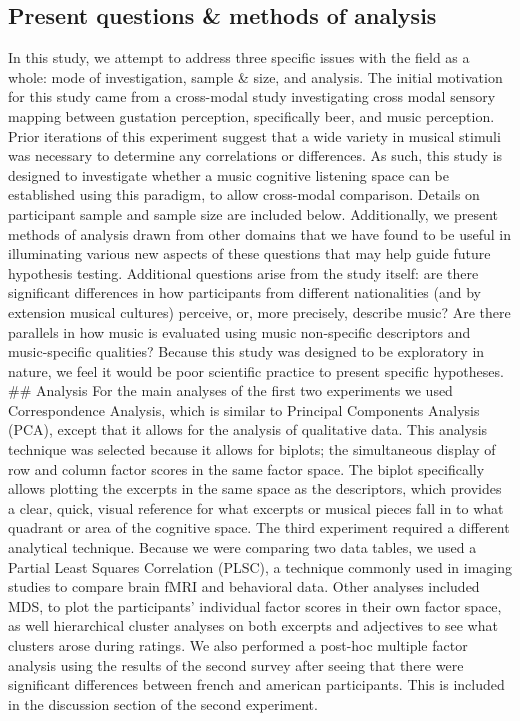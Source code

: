 \documentclass[
  english,
  man,floatsintext]{apa6}
\begin{document}
\hypertarget{present-questions-methods-of-analysis}{%
\subsection{Present questions \& methods of analysis}\label{present-questions-methods-of-analysis}}

In this study, we attempt to address three specific issues with the field as a whole: mode of investigation, sample \& size, and analysis. The initial motivation for this study came from a cross-modal study investigating cross modal sensory mapping between gustation perception, specifically beer, and music perception. Prior iterations of this experiment suggest that a wide variety in musical stimuli was necessary to determine any correlations or differences. As such, this study is designed to investigate whether a music cognitive listening space can be established using this paradigm, to allow cross-modal comparison. Details on participant sample and sample size are included below.
Additionally, we present methods of analysis drawn from other domains that we have found to be useful in illuminating various new aspects of these questions that may help guide future hypothesis testing.
Additional questions arise from the study itself: are there significant differences in how participants from different nationalities (and by extension musical cultures) perceive, or, more precisely, describe music? Are there parallels in how music is evaluated using music non-specific descriptors and music-specific qualities? Because this study was designed to be exploratory in nature, we feel it would be poor scientific practice to present specific hypotheses.\\
\#\# Analysis
For the main analyses of the first two experiments we used Correspondence Analysis, which is similar to Principal Components Analysis (PCA), except that it allows for the analysis of qualitative data. This analysis technique was selected because it allows for biplots; the simultaneous display of row and column factor scores in the same factor space. The biplot specifically allows plotting the excerpts in the same space as the descriptors, which provides a clear, quick, visual reference for what excerpts or musical pieces fall in to what quadrant or area of the cognitive space. The third experiment required a different analytical technique. Because we were comparing two data tables, we used a Partial Least Squares Correlation (PLSC), a technique commonly used in imaging studies to compare brain fMRI and behavioral data. Other analyses included MDS, to plot the participants' individual factor scores in their own factor space, as well hierarchical cluster analyses on both excerpts and adjectives to see what clusters arose during ratings. We also performed a post-hoc multiple factor analysis using the results of the second survey after seeing that there were significant differences between french and american participants. This is included in the discussion section of the second experiment.
\end{document}

